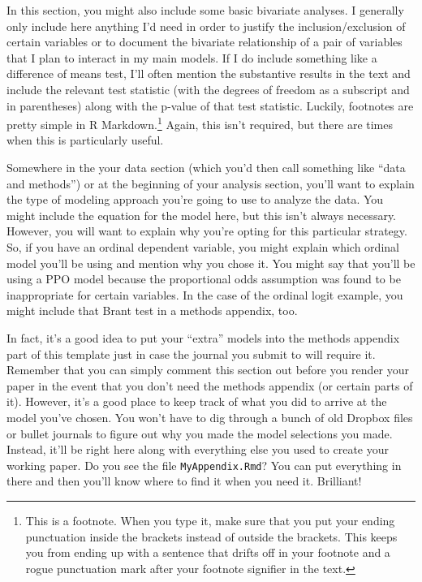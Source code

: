 \documentclass[12pt]{article}
\begin{document}
In this section, you might also include some basic bivariate analyses. I generally only include here anything I'd need in order to justify the inclusion/exclusion of certain variables or to document the bivariate relationship of a pair of variables that I plan to interact in my main models. If I do include something like a difference of means test, I'll often mention the substantive results in the text and include the relevant test statistic (with the degrees of freedom as a subscript and in parentheses) along with the p-value of that test statistic. Luckily, footnotes are pretty simple in R Markdown.\footnote{This is a footnote. When you type it, make sure that you put your ending punctuation inside the brackets instead of outside the brackets. This keeps you from ending up with a sentence that drifts off in your footnote and a rogue punctuation mark after your footnote signifier in the text.} Again, this isn't required, but there are times when this is particularly useful.

Somewhere in the your data section (which you'd then call something like ``data and methods'') or at the beginning of your analysis section, you'll want to explain the type of modeling approach you're going to use to analyze the data. You might include the equation for the model here, but this isn't always necessary. However, you will want to explain why you're opting for this particular strategy. So, if you have an ordinal dependent variable, you might explain which ordinal model you'll be using and mention why you chose it. You might say that you'll be using a PPO model because the proportional odds assumption was found to be inappropriate for certain variables. In the case of the ordinal logit example, you might include that Brant test in a methods appendix, too.

In fact, it's a good idea to put your ``extra'' models into the methods appendix part of this template just in case the journal you submit to will require it. Remember that you can simply comment this section out before you render your paper in the event that you don't need the methods appendix (or certain parts of it). However, it's a good place to keep track of what you did to arrive at the model you've chosen. You won't have to dig through a bunch of old Dropbox files or bullet journals to figure out why you made the model selections you made. Instead, it'll be right here along with everything else you used to create your working paper. Do you see the file \texttt{MyAppendix.Rmd}? You can put everything in there and then you'll know where to find it when you need it. Brilliant!
\end{document}
